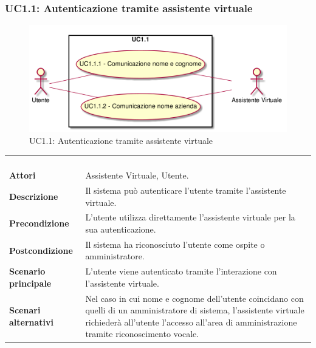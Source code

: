 \newpage\subsubsection{UC1.1: Autenticazione tramite assistente virtuale}
\label{UC1.1}
\begin{figure}[h]
\centering
\includegraphics[width=\textwidth,height=\textheight,keepaspectratio]{images/UseCaseUC11.png}
\caption{UC1.1: Autenticazione tramite assistente virtuale}
\end{figure}
\begin{longtable}{l|p{10cm}}
\rowcolor[gray]{0.8} \multicolumn{2}{c}{} \\
\rowcolor[gray]{0.8} \multicolumn{2}{c}{\textbf{UC1.1 - Autenticazione tramite assistente virtuale}} \\
\rowcolor[gray]{0.8} \multicolumn{2}{c}{} \\
\hline
&\\
\textbf{Attori} & Assistente Virtuale, Utente.\\[7pt]
\textbf{Descrizione} & Il sistema può autenticare l'utente tramite l'assistente virtuale.\\[7pt]
\textbf{Precondizione} & L'utente utilizza direttamente l'assistente virtuale per la sua autenticazione.\\[7pt]
\textbf{Postcondizione} & Il sistema ha riconosciuto l'utente come ospite o amministratore.\\[7pt]
\textbf{Scenario principale} &L'utente viene autenticato tramite l'interazione con l'assistente virtuale.\\[7pt]
\textbf{Scenari alternativi} & Nel caso in cui nome e cognome dell'utente coincidano con quelli di un amministratore di sistema, l'assistente virtuale 
richiederà all'utente l'accesso all'area di amministrazione tramite riconoscimento vocale.\\[7pt]\hline
\end{longtable}

